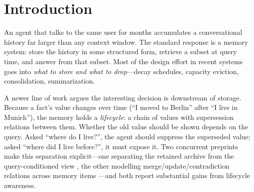 \documentclass[11pt]{article}
\begin{document}
\begin{abstract}
Two methodological findings generalize beyond this system. First, an uncontrolled difference in system-prompt wording between our baseline runner and our method runner manufactured $1.6$ points of illusory gain, by making the baseline decline to answer on 51 of 470 answerable questions versus 19 for the method. Second, and more consequential for how such systems are developed: across 68 offline-validated claims about candidate improvements, 56 failed adversarial verification, and the dominant failure mode was that the offline proxy---gold-string coverage, evidence-set completeness, derivability---reproduced arithmetically while failing to predict answer correctness. Two interventions that offline analysis rejected turned out to be the single largest real gain we measured. We conclude that in this regime only paired online measurement licenses a design decision.
\end{abstract}

\section{Introduction}

An agent that talks to the same user for months accumulates a conversational history far larger than any context window. The standard response is a memory system: store the history in some structured form, retrieve a subset at query time, and answer from that subset. Most of the design effort in recent systems goes into \emph{what to store and what to drop}---decay schedules, capacity eviction, consolidation, summarization.

A newer line of work argues the interesting decision is downstream of storage. Because a fact's value changes over time (``I moved to Berlin'' after ``I live in Munich''), the memory holds a \emph{lifecycle}: a chain of values with supersession relations between them. Whether the old value should be shown depends on the query. Asked ``where do I live?'', the agent should suppress the superseded value; asked ``where did I live before?'', it must expose it. Two concurrent preprints make this separation explicit---one separating the retained archive from the query-conditioned view \citep{rdforget}, the other modelling merge/update/contradiction relations across memory items \citep{memorylace}---and both report substantial gains from lifecycle awareness.
\end{document}
